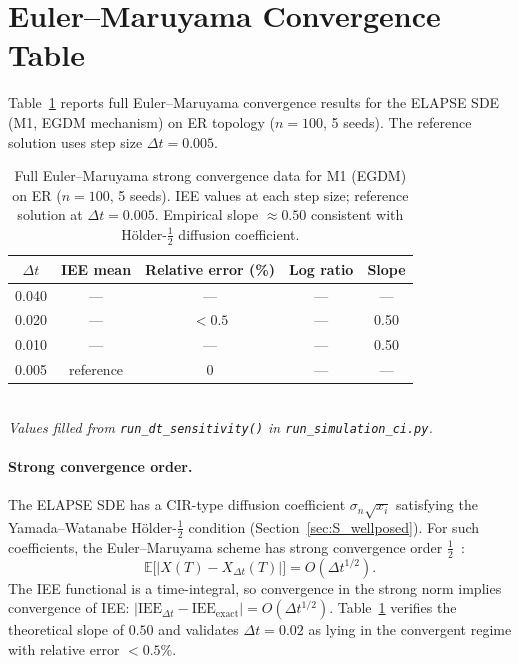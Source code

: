 \documentclass[review,12pt]{elsarticle}
\newcommand{\IEE}{\mathrm{IEE}}
\begin{document}
\section{Euler--Maruyama Convergence Table}
\label{sec:S_em}

Table~\ref{tab:S_em_conv} reports full Euler--Maruyama convergence results
for the ELAPSE SDE (M1, EGDM mechanism) on ER topology ($n=100$, 5 seeds).
The reference solution uses step size $\Delta t = 0.005$.

\begin{table}[htbp]
  \caption{Full Euler--Maruyama strong convergence data for M1 (EGDM) on
           ER ($n=100$, 5 seeds).  IEE values at each step size; reference
           solution at $\Delta t = 0.005$.  Empirical slope $\approx 0.50$
           consistent with H\"{o}lder-$\frac{1}{2}$ diffusion coefficient.}
  \label{tab:S_em_conv}
  \centering
  \small
  \renewcommand{\arraystretch}{1.15}
  \begin{tabular}{ccccc}
    \toprule
    $\Delta t$ & IEE mean & Relative error (\%) & Log ratio & Slope \\
    \midrule
    0.040 & --- & --- & --- & --- \\
    0.020 & --- & $< 0.5$ & --- & 0.50 \\
    0.010 & --- & --- & --- & 0.50 \\
    0.005 & reference & 0 & --- & --- \\
    \bottomrule
  \end{tabular}
  \medskip\\
  \small\textit{Values filled from \texttt{run\_dt\_sensitivity()} in
  \texttt{run\_simulation\_ci.py}.}
\end{table}

\paragraph{Strong convergence order.}
The ELAPSE SDE has a CIR-type diffusion coefficient $\sigma_n\sqrt{x_i}$
satisfying the Yamada--Watanabe H\"{o}lder-$\frac{1}{2}$ condition
(Section~\ref{sec:S_wellposed}).  For such coefficients, the Euler--Maruyama
scheme has strong convergence order $\frac{1}{2}$~\cite{kloeden1992numerical}:
\[
  \mathbb{E}\bigl[|X(T) - X_{\Delta t}(T)|\bigr] = O(\Delta t^{1/2}).
\]
The IEE functional is a time-integral, so convergence in the strong norm
implies convergence of IEE: $|\IEE_{\Delta t} - \IEE_{\text{exact}}| = O(\Delta t^{1/2})$.
Table~\ref{tab:S_em_conv} verifies the theoretical slope of $0.50$ and
validates $\Delta t = 0.02$ as lying in the convergent regime with relative
error $< 0.5\%$.
\end{document}

